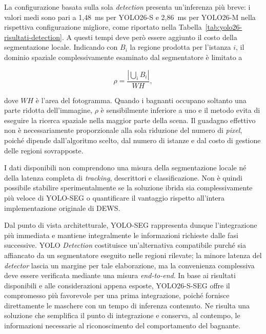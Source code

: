 La configurazione basata sulla sola \textit{detection} presenta un'inferenza più breve: i valori medi sono pari a 1{,}48~ms per YOLO26-S e 2{,}86~ms per YOLO26-M nella rispettiva configurazione migliore, come riportato nella Tabella~\ref{tab:yolo26-risultati-detection}. A questi tempi deve però essere aggiunto il costo della segmentazione locale. Indicando con $B_i$ la regione prodotta per l'istanza $i$, il dominio spaziale complessivamente esaminato dal segmentatore è limitato a

\begin{equation}
    \rho
    =
    \frac{\left|\bigcup_i B_i\right|}{W H},
\end{equation}

dove $W H$ è l'area del fotogramma. Quando i bagnanti occupano soltanto una parte ridotta dell'immagine, $\rho$ è sensibilmente inferiore a uno e il metodo evita di eseguire la ricerca spaziale nella maggior parte della scena. Il guadagno effettivo non è necessariamente proporzionale alla sola riduzione del numero di \textit{pixel}, poiché dipende dall'algoritmo scelto, dal numero di istanze e dal costo di gestione delle regioni sovrapposte.

I dati disponibili non comprendono una misura della segmentazione locale né della latenza completa di \textit{tracking}, descrittori e classificazione. Non è quindi possibile stabilire sperimentalmente se la soluzione ibrida sia complessivamente più veloce di YOLO-SEG o quantificare il vantaggio rispetto all'intera implementazione originale di DEWS.

Dal punto di vista architetturale, YOLO-SEG rappresenta dunque l'integrazione più immediata e mantiene integralmente le informazioni richieste dalle fasi successive. YOLO \textit{Detection} costituisce un'alternativa compatibile purché sia affiancato da un segmentatore eseguito nelle regioni rilevate; la minore latenza del \textit{detector} lascia un margine per tale elaborazione, ma la convenienza complessiva deve essere verificata mediante una misura \textit{end-to-end}. In base ai risultati disponibili e alle considerazioni appena esposte, YOLO26-S-SEG offre il compromesso più favorevole per una prima integrazione, poiché fornisce direttamente le maschere con un tempo di inferenza contenuto. Ne risulta una soluzione che semplifica il punto di integrazione e conserva, al contempo, le informazioni necessarie al riconoscimento del comportamento del bagnante.

